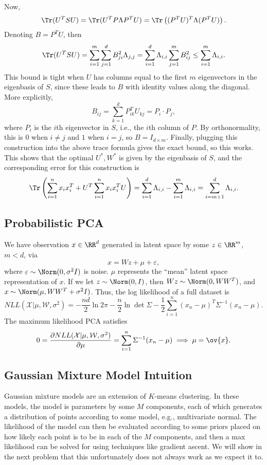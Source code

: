 Now,
\[\Tr(U^TSU) = \Tr(U^TP\Lambda P^TU) = \Tr\left((P^TU)^T\Lambda(P^TU)\right).\]
Denoting $B = P^TU$, then 
\[\Tr(U^TSU) = \sum_{i=1}^m \sum_{j=1}^d B_{ji}^2\Lambda_{j,j} = \sum_{i=1}^d\Lambda_{i,i}\sum_{j=1}^mB_{ij}^2\leq \sum_{i=1}^m\Lambda_{i,i}.\]
This bound is tight when $U$ has columns equal to the first $m$ eigenvectors in the eigenbasis of $S$, since these leads to $B$ with identity values along the diagonal. More explicitly, 
\[B_{ij} = \sum_{k=1}^d P^T_{ik}U_{kj} = P_i\cdot P_j,\]
where $P_i$ is the $i$th eigenvector in $S$, i.e., the $i$th column of $P$. By orthonormality, this is $0$ when $i\neq j$ and $1$ when $i=j$, so $B = I_{d\times m}$. Finally, plugging this construction into the above trace formula gives the exact bound, so this works. This shows that the optimal $U^*,W^*$ is given by the eigenbasis of $S$, and the corresponding error for this construction is 
\[\Tr\left(\sum_{i=1}^nx_ix_i^T + U^T\sum_{i=1}^nx_ix_i^TU\right) = \sum_{i=1}^d \Lambda_{i,i} - \sum_{i=1}^m\Lambda_{i,i} = \sum_{i=m+1}^d \Lambda_{i,i}.\]

\subsection{Probabilistic PCA}

We have observation $x\in \RR^d$ generated in latent space by some $z\in \RR^m$, $m < d$, via 
\[x = Wz + \mu + \varepsilon,\]
where $\varepsilon \sim \Norm(0, \sigma^2I)$ is noise. $\mu$ represents the ``mean'' latent space representation of $x$. If we let $z\sim \Norm(0, I)$, then $Wz\sim \Norm(0, WW^T)$, and $x \sim \Norm(\mu, WW^T + \sigma^2 I)$. Thus, the log likelihood of a full dataset is 
\[NLL(\mathcal{X}|\mu, \mathcal{W}, \sigma^2) = -\frac{nd}{2}\ln{2\pi} - \frac{n}{2}\ln{\det{\Sigma}} - \frac{1}{2}\sum_{i=1}^n (x_n - \mu)^T\Sigma^{-1}(x_n - \mu).\]
The maximum likelihood PCA satisfies 
\[0 = \frac{\partial NLL(\mathcal{X}|\mu, \mathcal{W}, \sigma^2)}{\partial \mu} = \sum_{i=1}^n\Sigma^{-1}(x_n - \mu) \implies \mu = \ov{x}.\]

\subsection{Gaussian Mixture Model Intuition}

Gaussian mixture models are an extension of $K$-means clustering. In these models, the model is parameters by some $M$ components, each of which generates a distribution of points according to some model, e.g., multivariate normal. The likelihood of the model can then be evaluated according to some priors placed on how likely each point is to be in each of the $M$ components, and then a max likelihood can be solved for using techniques like gradient ascent. We will show in the next problem that this unfortunately does not always work as we expect it to. 

